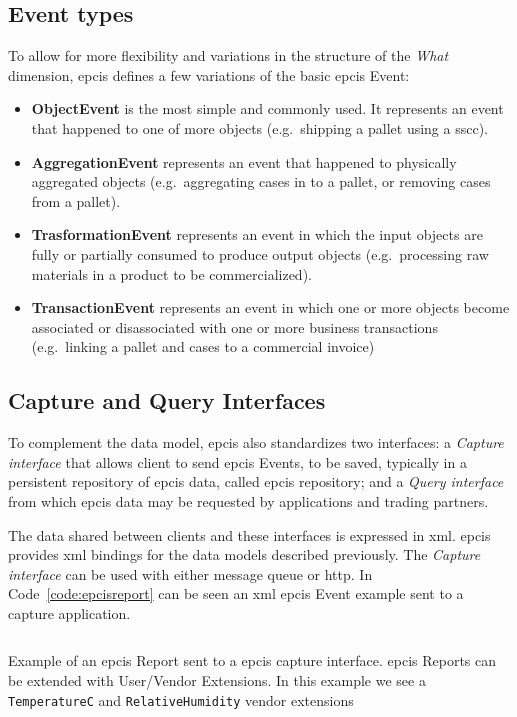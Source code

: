 \subsection{Event types}

To allow for more flexibility and variations in the structure of the \emph{What} dimension, \ac{epcis} defines a few variations of the basic \ac{epcis} Event:

\begin{itemize}
    \item \textbf{ObjectEvent} is the most simple and commonly used. It represents an event that happened to one of more objects (e.g.\ shipping a pallet using a \ac{sscc}).
    \item \textbf{AggregationEvent} represents an event that happened to physically aggregated objects (e.g.\ aggregating cases in to a pallet, or removing cases from a pallet).
    \item \textbf{TrasformationEvent} represents an event in which the input objects are fully or partially consumed to produce output objects (e.g.\ processing raw materials in a product to be commercialized).
    \item \textbf{TransactionEvent} represents an event in which one or more objects become associated or disassociated with one or more business transactions (e.g.\ linking a pallet and cases to a commercial invoice)
\end{itemize}

\subsection{Capture and Query Interfaces}

To complement the data model, \ac{epcis} also standardizes two interfaces: a \emph{Capture interface} that allows client to send \ac{epcis} Events, to be saved, typically in a persistent repository of \ac{epcis} data, called \ac{epcis} repository; and a \emph{Query interface} from which \ac{epcis} data may be requested by applications and trading partners.

The data shared between clients and these interfaces is expressed in \ac{xml}. \ac{epcis} provides \ac{xml} bindings for the data models described previously.
The \emph{Capture interface} can be used with either message queue or \ac{http}. In Code~\ref{code:epcisreport} can be seen an \ac{xml} \ac{epcis} Event example sent to a capture application. 

\begin{listing}
    \inputminted[linenos, breaklines]{xml}{./code/sota/EPCIS_query_response.xml}
    \caption[Example of an \ac{epcis} Report sent to a \ac{epcis} capture interface]{Example of an \ac{epcis} Report sent to a \ac{epcis} capture interface. \ac{epcis} Reports can be extended with User/Vendor Extensions. In this example we see a \texttt{TemperatureC} and \texttt{RelativeHumidity} vendor extensions}
    \label{code:epcisreport}
\end{listing}

